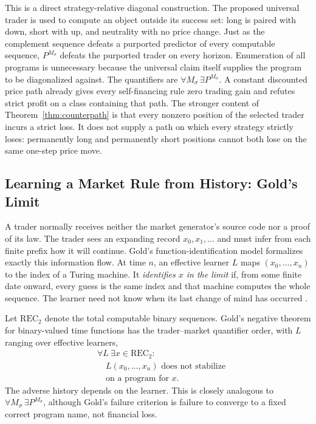 \documentclass[aps,pra,reprint,superscriptaddress,amsmath,amssymb,floatfix]{revtex4-2}
\theoremstyle{plain}
\theoremstyle{definition}
\theoremstyle{remark}
\begin{document}
This is a direct strategy-relative diagonal construction. The proposed
universal trader is used to compute an object outside its success set: long is
paired with down, short with up, and neutrality with no price change. Just as
the complement sequence defeats a purported predictor of every computable
sequence, \(P^{M_\sigma}\) defeats the purported trader on every horizon.
Enumeration of all programs is unnecessary because the universal claim itself
supplies the program to be diagonalized against. The quantifiers are
\(\forall M_\sigma\,\exists P^{M_\sigma}\). A constant discounted price path
already gives every self-financing rule zero trading gain and refutes strict
profit on a class containing that path. The stronger content of
Theorem~\ref{thm:counterpath} is that every nonzero position of the selected
trader incurs a strict loss. It does not supply a path on which every strategy
strictly loses: permanently long and permanently short positions cannot both
lose on the same one-step price move.

\subsection{Learning a Market Rule from History: Gold's Limit}

A trader normally receives neither the market generator's source code nor a
proof of its law. The trader sees an expanding record
\(x_0,x_1,\ldots\) and must infer from each finite prefix how it will continue.
Gold's function-identification model formalizes exactly this information flow.
At time \(n\), an effective learner \(L\) maps
\((x_0,\ldots,x_n)\) to the index of a Turing machine. It
\emph{identifies \(x\) in the limit} if, from some finite date onward, every
guess is the same index and that machine computes the whole sequence. The
learner need not know when its last change of mind has occurred
\cite{go-65,go-67}.

Let \(\mathrm{REC}_2\) denote the total computable binary sequences. Gold's
negative theorem for binary-valued time functions has the trader--market
quantifier order, with \(L\) ranging over effective learners,
\begin{equation}
  \begin{aligned}
  &\forall L\ \exists x\in\mathrm{REC}_2: \\
  &\quad L(x_0,\ldots,x_n)\text{ does not stabilize}\\
  &\quad \text{on a program for }x .
  \end{aligned}
  \label{eq:goldquantifiers}
\end{equation}
The adverse history depends on the learner. This is closely analogous to
\(\forall M_\sigma\,\exists P^{M_\sigma}\), although Gold's failure criterion
is failure to converge to a fixed correct program name, not financial loss.
\end{document}
